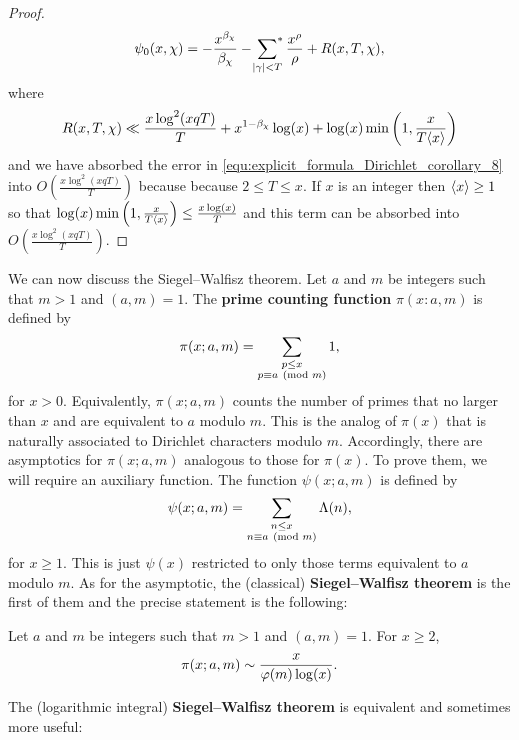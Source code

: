 \begin{proof}
      \begin{equation}\label{equ:explicit_formula_Dirichlet_corollary_10}
        \psi_{0}(x,\chi) = -\frac{x^{\beta_{\chi}}}{\beta_{\chi}}-\sideset{}{^{\ast}}\sum_{|\gamma| < T}\frac{x^{\rho}}{\rho}+R(x,T,\chi),
      \end{equation}
      where
      \[
        R(x,T,\chi) \ll \frac{x\log^{2}(xqT)}{T}+x^{1-\beta_{\chi}}\log(x)+\log(x)\min\left(1,\frac{x}{T\langle x\rangle}\right)
      \]
      and we have absorbed the error in \cref{equ:explicit_formula_Dirichlet_corollary_8} into $O\left(\frac{x\log^{2}(xqT)}{T}\right)$ because because $2 \le T \le x$. If $x$ is an integer then $\langle x\rangle \ge 1$ so that $\log(x)\min\left(1,\frac{x}{T\langle x\rangle}\right) \le \frac{x\log(x)}{T}$ and this term can be absorbed into $O\left(\frac{x\log^{2}(xqT)}{T}\right)$.
    \end{proof}
    
    We can now discuss the Siegel–Walfisz theorem. Let $a$ and $m$ be integers such that $m > 1$ and $(a,m) = 1$. The \textbf{prime counting function} $\pi(x:a,m)$ is defined by
    \[
      \pi(x;a,m) = \sum_{\substack{p \le x \\ p \equiv a \ (\mathrm{mod}\text{ }m)}}1,
    \]
    for $x > 0$. Equivalently, $\pi(x;a,m)$ counts the number of primes that no larger than $x$ and are equivalent to $a$ modulo $m$. This is the analog of $\pi(x)$ that is naturally associated to Dirichlet characters modulo $m$. Accordingly, there are asymptotics for $\pi(x;a,m)$ analogous to those for $\pi(x)$. To prove them, we will require an auxiliary function. The function $\psi(x;a,m)$ is defined by
    \[
      \psi(x;a,m) = \sum_{\substack{n \le x \\ n \equiv a \ (\mathrm{mod}\text{ }m)}}\Lambda(n),
    \]
    for $x \ge 1$. This is just $\psi(x)$ restricted to only those terms equivalent to $a$ modulo $m$. As for the asymptotic, the (classical) \textbf{Siegel–Walfisz theorem} is the first of them and the precise statement is the following:

    \begin{theorem*}
      Let $a$ and $m$ be integers such that $m > 1$ and $(a,m) = 1$. For $x \ge 2$,
      \[
        \pi(x;a,m) \sim \frac{x}{\varphi(m)\log(x)}.
      \]
    \end{theorem*}
    
    The (logarithmic integral) \textbf{Siegel–Walfisz theorem} is equivalent and sometimes more useful:


